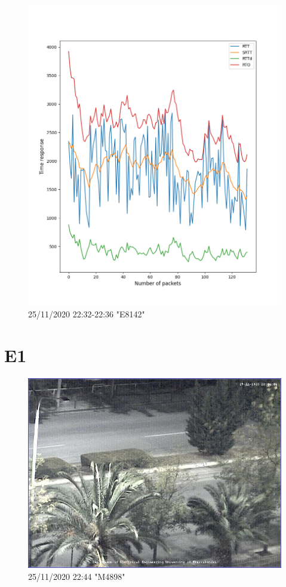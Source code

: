 \documentclass[hidelinks, 12pt, a4paper]{article}
\begin{document}
\begin{figure}[h!]
\centering
	\includegraphics[height=.38\textheight, width=\textwidth]{assets/session1/r1.png}
    \caption{25/11/2020 22:32-22:36 "E8142"} 
\end{figure}


\section{E1}

\begin{figure}[h!]
\centering
	\includegraphics[height=.38\textheight, width=\textwidth]{assets/session1/image_fix.jpg}
	\caption{25/11/2020 22:44 "M4898"} 
\end{figure}
\end{document}
